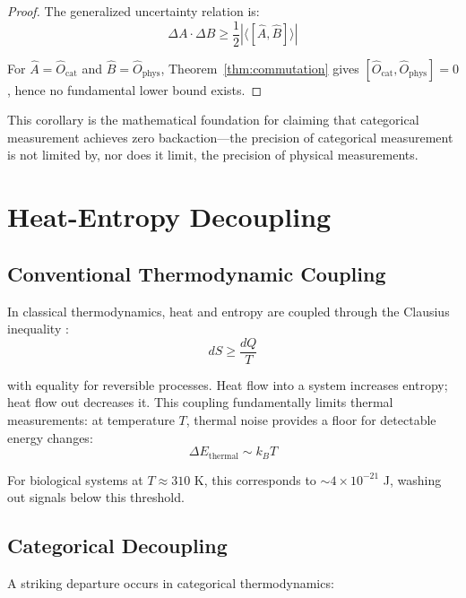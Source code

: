 \documentclass[twocolumn,10pt]{article}
\begin{document}
\begin{proof}
The generalized uncertainty relation is:
\begin{equation}
    \Delta A \cdot \Delta B \geq \frac{1}{2} |\langle [\hat{A}, \hat{B}] \rangle|
\end{equation}

For $\hat{A} = \hat{O}_{\text{cat}}$ and $\hat{B} = \hat{O}_{\text{phys}}$, Theorem~\ref{thm:commutation} gives $[\hat{O}_{\text{cat}}, \hat{O}_{\text{phys}}] = 0$, hence no fundamental lower bound exists.
\end{proof}

This corollary is the mathematical foundation for claiming that categorical measurement achieves zero backaction---the precision of categorical measurement is not limited by, nor does it limit, the precision of physical measurements.

\section{Heat-Entropy Decoupling}

\subsection{Conventional Thermodynamic Coupling}

In classical thermodynamics, heat and entropy are coupled through the Clausius inequality \cite{fermi1956}:
\begin{equation}
    dS \geq \frac{dQ}{T}
\end{equation}

with equality for reversible processes. Heat flow into a system increases entropy; heat flow out decreases it. This coupling fundamentally limits thermal measurements: at temperature $T$, thermal noise provides a floor for detectable energy changes:
\begin{equation}
    \Delta E_{\text{thermal}} \sim k_B T
\end{equation}

For biological systems at $T \approx 310$ K, this corresponds to $\sim 4 \times 10^{-21}$ J, washing out signals below this threshold.

\subsection{Categorical Decoupling}

A striking departure occurs in categorical thermodynamics:
\end{document}
